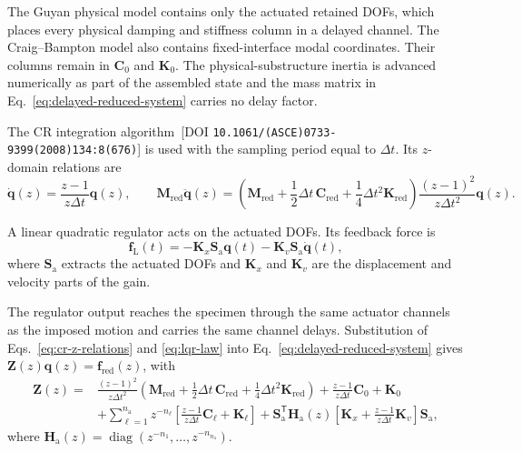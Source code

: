\documentclass[11pt]{article}
\newcommand{\rev}[1]{{\color{red}#1}}
\newenvironment{revision}{\begingroup\color{red}}{\endgroup}
\begin{document}
\begin{revision}
The Guyan physical model contains only the actuated retained DOFs, which places every physical damping and stiffness column in a delayed channel. The Craig--Bampton model also contains fixed-interface modal coordinates. Their columns remain in \(\mathbf{C}_{0}\) and \(\mathbf{K}_{0}\). The physical-substructure inertia is advanced numerically as part of the assembled state and the mass matrix in Eq.~\eqref{eq:delayed-reduced-system} carries no delay factor.
\end{revision}

The CR integration algorithm \cite{ChenRicles2008CR}\,\rev{[DOI \nolinkurl{10.1061/(ASCE)0733-9399(2008)134:8(676)}]} is used with the sampling period equal to \(\Delta t\). Its \(z\)-domain relations are
\begin{equation}
    \dot{\bm{q}}(z)=\frac{z-1}{z\Delta t}\bm{q}(z),
    \qquad
    \mathbf{M}_{\mathrm{red}}\ddot{\bm{q}}(z)
    =\left(
    \mathbf{M}_{\mathrm{red}}+\frac{1}{2}\Delta t\,\mathbf{C}_{\mathrm{red}}
    +\frac{1}{4}\Delta t^{2}\mathbf{K}_{\mathrm{red}}
    \right)
    \frac{(z-1)^{2}}{z\Delta t^{2}}\bm{q}(z).
    \label{eq:cr-z-relations}
\end{equation}

A linear quadratic regulator acts on the actuated DOFs. Its feedback force is
\begin{equation}
    \bm{f}_{\mathrm{L}}(t)
    =-\mathbf{K}_{x}\mathbf{S}_{\mathrm{a}}\bm{q}(t)
    -\mathbf{K}_{v}\mathbf{S}_{\mathrm{a}}\dot{\bm{q}}(t),
    \label{eq:lqr-law}
\end{equation}
where \(\mathbf{S}_{\mathrm{a}}\) extracts the actuated DOFs and \(\mathbf{K}_{x}\) and \(\mathbf{K}_{v}\) are the displacement and velocity parts of the gain.

\begin{revision}
The regulator output reaches the specimen through the same actuator channels as the imposed motion and carries the same channel delays. Substitution of Eqs.~\eqref{eq:cr-z-relations} and \eqref{eq:lqr-law} into Eq.~\eqref{eq:delayed-reduced-system} gives \(\mathbf{Z}(z)\bm{q}(z)=\bm{f}_{\mathrm{red}}(z)\), with
\end{revision}
\begin{equation}
\begin{split}
\mathbf{Z}(z)=&
\frac{(z-1)^2}{z\Delta t^2}
\left(
\mathbf{M}_{\mathrm{red}}+\frac{1}{2}\Delta t\,\mathbf{C}_{\mathrm{red}}
+\frac{1}{4}\Delta t^2\mathbf{K}_{\mathrm{red}}
\right)
+\frac{z-1}{z\Delta t}\mathbf{C}_{0}+\mathbf{K}_{0}\\
&+\sum_{\ell=1}^{n_{\mathrm{a}}}z^{-n_{\ell}}
\left[
\frac{z-1}{z\Delta t}\mathbf{C}_{\ell}+\mathbf{K}_{\ell}
\right]
+\mathbf{S}_{\mathrm{a}}^{\mathsf{T}}\mathbf{H}_{\mathrm{a}}(z)
\left[
\mathbf{K}_{x}+\frac{z-1}{z\Delta t}\mathbf{K}_{v}
\right]\mathbf{S}_{\mathrm{a}},
\end{split}
\label{eq:closed-loop-Z}
\end{equation}
where \(\mathbf{H}_{\mathrm{a}}(z)=\operatorname{diag}(z^{-n_{1}},\ldots,z^{-n_{n_{\mathrm{a}}}})\).
\end{document}
